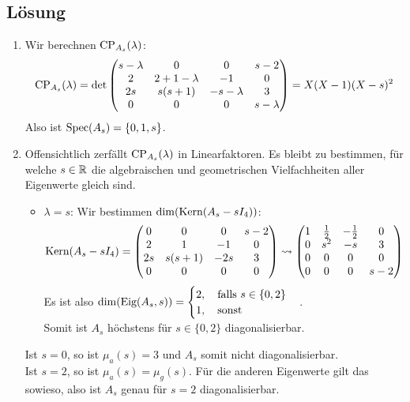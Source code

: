 \subsection{Lösung}
\begin{enumerate}
	\item Wir berechnen \( \text{CP}_{A_s}(\lambda) \):
	\begin{equation*}
	 	\text{CP}_{A_s}(\lambda) = \det \begin{pmatrix}
	 		s - \lambda & 0 & 0 & s-2 \\
	 		2 & 2+1-\lambda & -1 & 0 \\
	 		2s & s(s+1) & -s-\lambda & 3 \\
	 		0 & 0 & 0 & s-\lambda
	 	\end{pmatrix} = X(X-1)(X-s)^2
	 \end{equation*} 
	 Also ist \( \text{Spec}(A_s) = \{ 0, 1, s \} \).

	 \item Offensichtlich zerfällt \( \text{CP}_{A_s}(\lambda) \) in Linearfaktoren. Es bleibt zu bestimmen, für welche \( s \in \mathbb{R} \) die algebraischen und geometrischen Vielfachheiten aller Eigenwerte gleich sind.
	 \begin{itemize}
	 	\item \( \lambda = s \): Wir bestimmen \( \dim(\text{Kern}(A_s - sI_4)) \):  
 		\begin{equation*}
 			\text{Kern}(A_s - sI_4) = \begin{pmatrix}
 				0 & 0 & 0 & s-2 \\
 				2 & 1 & -1 & 0 \\
 				2s & s(s+1) & -2s & 3 \\
 				0 & 0 & 0 & 0
 			\end{pmatrix} \leadsto \begin{pmatrix}
 				1 & \tfrac{1}{2} & -\tfrac{1}{2} & 0 \\
 				0 & s^2 & -s & 3 \\
 				0 & 0 & 0 & 0 \\
 				0 & 0 & 0 & s-2
 			\end{pmatrix}
 		\end{equation*}
 		Es ist also \( \dim(\text{Eig}(A_s, s)) = \begin{cases}
 			2, \quad \text{falls } s \in \{ 0, 2 \} \\
 			1, \quad \text{sonst}
 		\end{cases} \). \\ Somit ist \( A_s \) höchstens für \( s \in \{ 0, 2 \} \) diagonalisierbar.
	 \end{itemize}
	 Ist \( s = 0 \), so ist \( \mu_a(s) = 3 \) und \( A_s \) somit nicht diagonalisierbar. \\
	 Ist \( s = 2 \), so ist \( \mu_a(s) = \mu_g(s) \). Für die anderen Eigenwerte gilt das sowieso, also ist \( A_s \) genau für \( s = 2 \) diagonalisierbar.


\end{enumerate}
